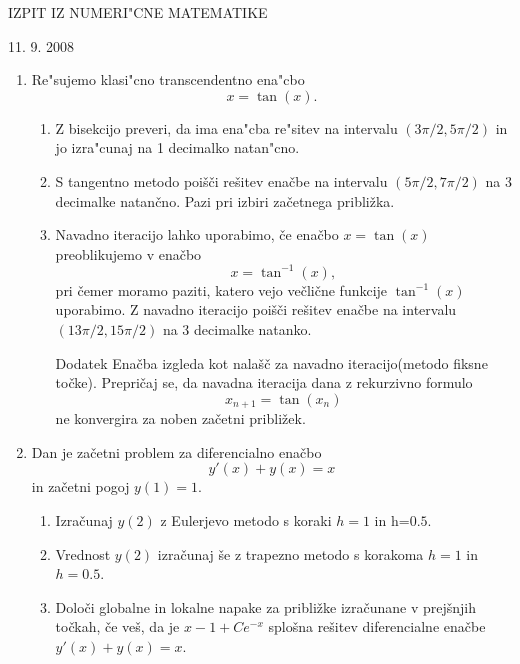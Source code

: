 \begin{center}
    {\large IZPIT IZ NUMERI"CNE MATEMATIKE}
    
    11. 9. 2008
\end{center}
\vspace{1.5cm}
\begin{enumerate}
        \item 
	    Re"sujemo klasi"cno transcendentno ena"cbo
	    \[x=\tan(x).\]
	    \begin{enumerate}
		\item Z bisekcijo preveri, da ima ena"cba re"sitev na intervalu $(3\pi/2,5\pi/2)$ in jo izra"cunaj na 1 decimalko natan"cno.
		\item S tangentno metodo poišči rešitev enačbe na intervalu $(5\pi/2,7\pi/2)$ na 3 decimalke natančno. Pazi pri izbiri začetnega približka. 
		\item Navadno iteracijo lahko uporabimo, če enačbo $x=\tan(x)$ preoblikujemo v enačbo
		    \[x=\tan^{-1}(x),\]
		    pri čemer moramo paziti, katero vejo večlične funkcije $\tan^{-1}(x)$ uporabimo. 
		    Z navadno iteracijo poišči rešitev enačbe na intervalu $(13\pi/2,15\pi/2)$ na 3 decimalke natanko.
		\item[Dodatek] Enačba izgleda kot nalašč za navadno iteracijo(metodo fiksne točke). Prepričaj se, da navadna iteracija dana z rekurzivno formulo
		    \[x_{n+1}=\tan(x_n)\]
		    ne konvergira za noben začetni približek.
	    \end{enumerate}
        \item  
	    Dan je začetni problem za diferencialno enačbo 
	    \[y'(x)+y(x)=x\]
	    in začetni pogoj $y(1)=1$.
	    
	    \begin{enumerate}
		\item Izračunaj $y(2)$ z Eulerjevo metodo s koraki $h=1$ in h=$0.5$. 
		\item Vrednost $y(2)$ izračunaj še z trapezno metodo s korakoma $h=1$ in $h=0.5$.
		\item Določi globalne in lokalne napake  za približke izračunane v 
		    prejšnjih točkah, če veš, da je 
		    $x-1+Ce^{-x}$ 
		    splošna rešitev diferencialne enačbe $y'(x)+y(x)=x$.
	    \end{enumerate}
\end{enumerate}
